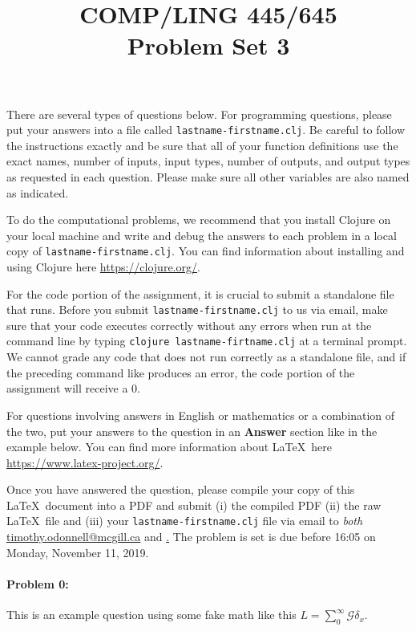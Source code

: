 \documentclass[10pt]{article}
\begin{document}
 
\title{COMP/LING 445/645\\Problem Set 3}
\date{}
\maketitle


There are several types of questions below. For programming questions,
please put your answers into a file called
\texttt{lastname-firstname.clj}. Be careful to follow the instructions
exactly and be sure that all of your function definitions use the
exact names, number of inputs, input types, number of outputs, and
output types as requested in each question. Please make sure all other
variables are also named as indicated.

To do the computational problems, we recommend that you install
Clojure on your local machine and write and debug the answers to each
problem in a local copy of \texttt{lastname-firstname.clj}. You can
find information about installing and using Clojure here
\url{https://clojure.org/}.

For the code portion of the assignment, it is crucial to submit a
standalone file that runs. Before you submit
\texttt{lastname-firstname.clj} to us via email, make sure that your
code executes correctly without any errors when run at the command
line by typing \texttt{clojure lastname-firtname.clj} at a terminal
prompt. We cannot grade any code that does not run correctly as a
standalone file, and if the preceding command like produces an error,
the code portion of the assignment will receive a $0$.

For questions involving answers in English or mathematics or a
combination of the two, put your answers to the question in an
\textbf{Answer} section like in the example below. You can find more
information about \LaTeX\ here \url{https://www.latex-project.org/}.

Once you have answered the question, please compile your copy of this
\LaTeX\ document into a PDF and submit (i) the compiled PDF (ii) the
raw \LaTeX\ file and (iii) your \texttt{lastname-firstname.clj} file
via email to \emph{both}
\href{mailto:timothy.odonnell@mcgill.ca}{timothy.odonnell@mcgill.ca}
and
\href{mailto:savanna.willerton@mail.mcgill.ca}\href{savanna.willerton@mail.mcgill.ca}.
The problem is set is due before 16:05 on Monday, November 11, 2019.

\hrulefill
\paragraph{Problem 0:}
This is an example question using some fake math like this
$L=\sum_0^{\infty} \mathcal{G} \delta_x$.
\end{document}
